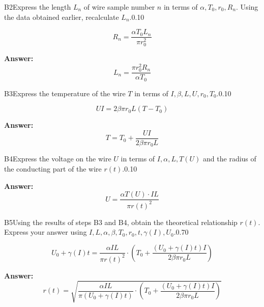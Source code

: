 \documentclass[11pt,a4paper]{article}
\begin{document}
\begin{solcard}{B2}{Express the length $L_n$ of wire sample number $n$ in terms of $\alpha, T_0, r_0, R_n$. Using the data obtained earlier, recalculate $L_n$.}{0.10}

\[R_n = \dfrac{\alpha T_0 L_n}{\pi r_0^2}\]

\par\smallskip\noindent\textbf{Answer:} \[L_n = \dfrac{\pi r_0^2 R_n}{\alpha T_0}\]
\end{solcard}

\begin{solcard}{B3}{Express the temperature of the wire $T$ in terms of $I , \beta, L, U, r_0, T_0$.}{0.10}

\[UI = 2\beta\pi r_0 L(T-T_0) \]

\par\smallskip\noindent\textbf{Answer:} \[T = T_0 + \dfrac{UI}{2\beta \pi r_0 L}\]
\end{solcard}

\begin{solcard}{B4}{Express the voltage on the wire $U$ in terms of $I , \alpha , L, T(U)$ and the radius of the conducting part of the wire $r(t)$.}{0.10}
\par\smallskip\noindent\textbf{Answer:} \[U = \dfrac{\alpha T(U) \cdot IL}{\pi r(t)^2}\]
\end{solcard}

\begin{solcard}{B5}{Using the results of steps B3 and B4, obtain the theoretical relationship $r(t)$. Express your answer using $I,L, \alpha, \beta, T_0, r_0, t, \gamma(I), U_0$.}{0.70}

\[U_0 + \gamma(I) t =\dfrac{\alpha IL}{\pi r(t)^2}\cdot \left(T_0 + \dfrac{(U_0 + \gamma(I)t)I}{2\beta \pi r_0 L}\right)\]

\par\smallskip\noindent\textbf{Answer:} \[r(t) = \sqrt{\dfrac{\alpha IL}{\pi (U_0 + \gamma(I) t)}\cdot \left(T_0 + \dfrac{(U_0 + \gamma(I)t)I}{2\beta \pi r_0 L}\right)}\]
\end{solcard}
\end{document}
